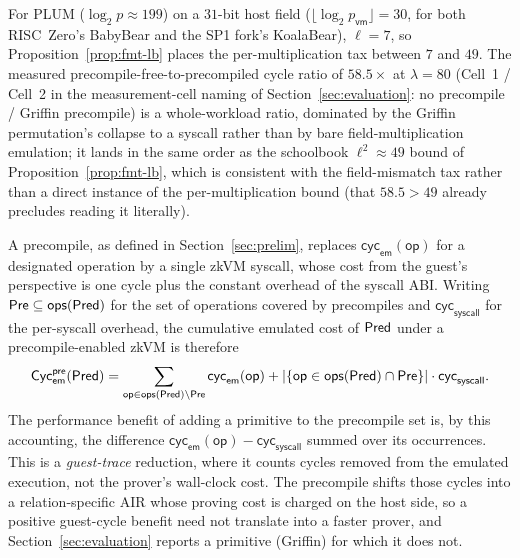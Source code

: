 \begin{remark}\label{rem:fmt-instantiation}
    For PLUM ($\log_2 p\approx 199$) on a $31$-bit host field ($\lfloor\log_2 p_{\mathsf{vm}}\rfloor = 30$, for both RISC~Zero's BabyBear and the SP1 fork's KoalaBear), $\ell = 7$, so Proposition~\ref{prop:fmt-lb} places the per-multiplication tax between $7$ and $49$. The measured precompile-free-to-precompiled cycle ratio of $58.5\times$ at $\lambda=80$ (Cell~1 / Cell~2 in the measurement-cell naming of Section~\ref{sec:evaluation}: no precompile / Griffin precompile) is a whole-workload ratio, dominated by the Griffin permutation's collapse to a syscall rather than by bare field-multiplication emulation; it lands in the same order as the schoolbook $\ell^2\approx 49$ bound of Proposition~\ref{prop:fmt-lb}, which is consistent with the field-mismatch tax rather than a direct instance of the per-multiplication bound (that $58.5 > 49$ already precludes reading it literally).
\end{remark}

A precompile, as defined in Section~\ref{sec:prelim}, replaces $\mathsf{cyc}_{\mathsf{em}}(\mathsf{op})$ for a designated operation by a single zkVM syscall, whose cost from the guest's perspective is one cycle plus the constant overhead of the syscall ABI. Writing $\mathsf{Pre}\subseteq\mathsf{ops}(\mathsf{Pred})$ for the set of operations covered by precompiles and $\mathsf{cyc}_{\mathsf{syscall}}$ for the per-syscall overhead, the cumulative emulated cost of $\mathsf{Pred}$ under a precompile-enabled zkVM is therefore
\begin{equation*}
  \mathsf{Cyc}_{\mathsf{em}}^{\mathsf{pre}}(\mathsf{Pred})
  =
  \sum_{\mathsf{op}\in\mathsf{ops}(\mathsf{Pred})\setminus\mathsf{Pre}}
  \mathsf{cyc}_{\mathsf{em}}(\mathsf{op})
  + |\{\mathsf{op}\in\mathsf{ops}(\mathsf{Pred})\cap\mathsf{Pre}\}|
  \cdot \mathsf{cyc}_{\mathsf{syscall}}.
\end{equation*} The performance benefit of adding a primitive to the precompile set is, by this accounting, the difference $\mathsf{cyc}_{\mathsf{em}}(\mathsf{op}) - \mathsf{cyc}_{\mathsf{syscall}}$ summed over its occurrences. This is a \emph{guest-trace} reduction, where it counts cycles removed from the emulated execution, not the prover's wall-clock cost. The precompile shifts those cycles into a relation-specific AIR whose proving cost is charged on the host side, so a positive guest-cycle benefit need not translate into a faster prover, and Section~\ref{sec:evaluation} reports a primitive (Griffin) for which it does not.

